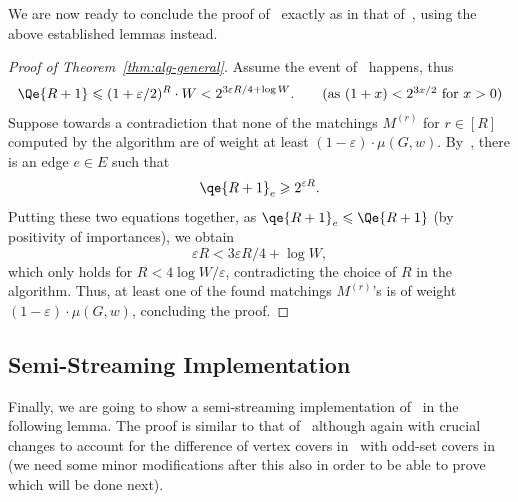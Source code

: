\documentclass{article}
\renewcommand{\leq}{\leqslant}
\renewcommand{\geq}{\geqslant}
\newcommand{\eps}{\varepsilon}
\begin{document}
We are now ready to conclude the proof of~ exactly as in that of~, using the above established lemmas instead. 

\begin{proof}[Proof of Theorem~\ref{thm:alg-general}]
	Assume the  event of~ happens, thus
	\begin{align*}
		\Qe{R+1} \leq (1+\eps/2)^{R} \cdot W < 2^{3\eps R/4 + \log{W}}. \tag{as $(1+x) < 2^{3x/2}$ for $x > 0$} 
	\end{align*}
	Suppose towards a contradiction that none of the matchings $M^{(r)}$ for $r \in [R]$ computed by the algorithm
	are of weight at least $(1-\eps) \cdot \mu(G,w)$. By~, there is an edge $e \in E$ such that 
	\[
		\qe{R+1}_e \geq 2^{\eps R}. 
	\]
	Putting these two equations together, as $\qe{R+1}_e \leq \Qe{R+1}$ (by positivity of importances), we obtain 
	\[
		\eps R < 3\eps R/4 + \log{W}, 
	\]
	which only holds for $R < 4\log{W}/\eps$, contradicting the choice of $R$ in the algorithm. Thus, at least one of the found matchings $M^{(r)}$'s is of weight $(1-\eps) \cdot \mu(G,w)$, 
	concluding the proof.
\end{proof}


\subsection*{Semi-Streaming Implementation}%

Finally, we are going to show a semi-streaming implementation of~ in the following lemma. 
The proof is similar to that of~ although again with crucial changes to account for the difference of vertex covers in~ with odd-set covers in~ (we need some minor 
modifications after this also in order to be able to prove~ which will be done next). 
\end{document}
